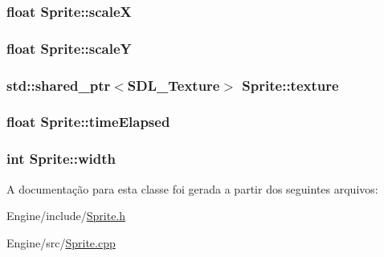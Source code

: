 \hypertarget{classSprite_af76ca5d25866a3107bcec1d2e59f8bcb}{
\subsubsection[{scale\+X}]{\setlength{\rightskip}{0pt plus 5cm}float Sprite\+::scale\+X\hspace{0.3cm}{\ttfamily [private]}}}\label{classSprite_af76ca5d25866a3107bcec1d2e59f8bcb}
\hypertarget{classSprite_ac4085b0144253c09bc94151a53079104}{
\subsubsection[{scale\+Y}]{\setlength{\rightskip}{0pt plus 5cm}float Sprite\+::scale\+Y\hspace{0.3cm}{\ttfamily [private]}}}\label{classSprite_ac4085b0144253c09bc94151a53079104}
\hypertarget{classSprite_a9f90b14f1a69209da8babfa6745dc1fe}{
\subsubsection[{texture}]{\setlength{\rightskip}{0pt plus 5cm}std\+::shared\+\_\+ptr$<$S\+D\+L\+\_\+\+Texture$>$ Sprite\+::texture\hspace{0.3cm}{\ttfamily [private]}}}\label{classSprite_a9f90b14f1a69209da8babfa6745dc1fe}
\hypertarget{classSprite_ab19d07e81660346ed85d92e518cd8399}{
\subsubsection[{time\+Elapsed}]{\setlength{\rightskip}{0pt plus 5cm}float Sprite\+::time\+Elapsed\hspace{0.3cm}{\ttfamily [private]}}}\label{classSprite_ab19d07e81660346ed85d92e518cd8399}
\hypertarget{classSprite_a0a3364944c5e361fc9e7ae406224d682}{
\subsubsection[{width}]{\setlength{\rightskip}{0pt plus 5cm}int Sprite\+::width\hspace{0.3cm}{\ttfamily [private]}}}\label{classSprite_a0a3364944c5e361fc9e7ae406224d682}


A documentação para esta classe foi gerada a partir dos seguintes arquivos\+:\begin{DoxyCompactItemize}
\item 
Engine/include/\hyperlink{Sprite_8h}{Sprite.\+h}\item 
Engine/src/\hyperlink{Sprite_8cpp}{Sprite.\+cpp}\end{DoxyCompactItemize}

